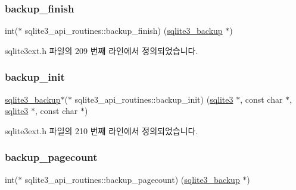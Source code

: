 \subsubsection{\texorpdfstring{backup\+\_\+finish}{backup\_finish}}
{\footnotesize\ttfamily int($\ast$ sqlite3\+\_\+api\+\_\+routines\+::backup\+\_\+finish) (\hyperlink{sqlite3_8h_a758dbaa6678a107d36a2646342623635}{sqlite3\+\_\+backup} $\ast$)}



sqlite3ext.\+h 파일의 209 번째 라인에서 정의되었습니다.

\mbox{\label{structsqlite3__api__routines_a95aba5aa303ede834a7fc66fa9b33c0a}} 
\subsubsection{\texorpdfstring{backup\+\_\+init}{backup\_init}}
{\footnotesize\ttfamily \hyperlink{sqlite3_8h_a758dbaa6678a107d36a2646342623635}{sqlite3\+\_\+backup}$\ast$($\ast$ sqlite3\+\_\+api\+\_\+routines\+::backup\+\_\+init) (\hyperlink{sqlite3_8h_a0ef6f2646262c8a9b24368d8ac140f69}{sqlite3} $\ast$, const char $\ast$, \hyperlink{sqlite3_8h_a0ef6f2646262c8a9b24368d8ac140f69}{sqlite3} $\ast$, const char $\ast$)}



sqlite3ext.\+h 파일의 210 번째 라인에서 정의되었습니다.

\mbox{\label{structsqlite3__api__routines_ae5500071d0a9d35db9273026a95857a8}} 
\subsubsection{\texorpdfstring{backup\+\_\+pagecount}{backup\_pagecount}}
{\footnotesize\ttfamily int($\ast$ sqlite3\+\_\+api\+\_\+routines\+::backup\+\_\+pagecount) (\hyperlink{sqlite3_8h_a758dbaa6678a107d36a2646342623635}{sqlite3\+\_\+backup} $\ast$)}



